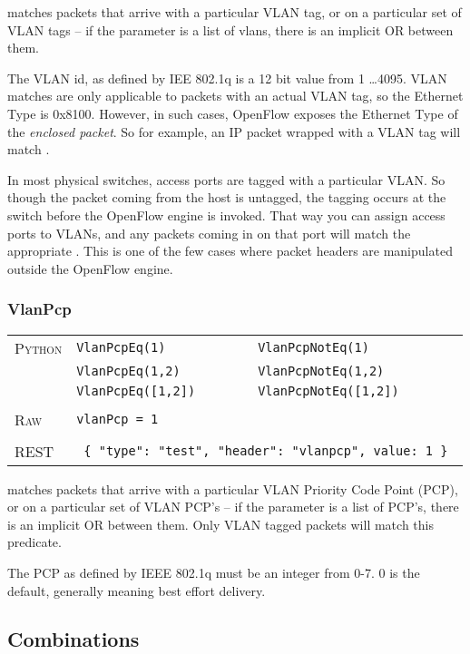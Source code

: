  matches packets that arrive with a particular VLAN tag, or on a particular set of VLAN tags -- 
if the 
parameter is a list of vlans, there is an implicit OR between them.  

The VLAN id, as defined by IEE 802.1q is a 12 bit value from 1 \ldots 4095.  VLAN matches are only applicable
to packets with an actual VLAN tag, so the Ethernet Type is 0x8100.  However, in such cases, 
OpenFlow exposes the Ethernet 
Type of the \emph{enclosed packet}.  So for example, an IP packet wrapped with a VLAN tag will match 
.  

In most physical switches, access ports are tagged with a particular VLAN.  So though the packet coming
from the host is untagged, the tagging occurs at the switch before the OpenFlow engine is invoked.  
That way you can assign access ports to VLANs, and any packets coming in on that port will match the
appropriate .  This is one of the few cases where packet headers are manipulated outside the
OpenFlow engine.  

\subsubsection{VlanPcp}

\bigskip
\begin{tabularx}{\linewidth}{lXX}
\textsc{Python}   & \texttt{VlanPcpEq(1)}    & \texttt{VlanPcpNotEq(1)} \\
    & \texttt{VlanPcpEq(1,2)}  & \texttt{VlanPcpNotEq(1,2)} \\
    & \texttt{VlanPcpEq([1,2])}  & \texttt{VlanPcpNotEq([1,2])} \\ \\
\textsc{Raw}    & \texttt{vlanPcp = 1}     & \\ \\
\textsc{REST} & \multicolumn{2}{l}{\texttt{ \{ "type": "test", "header": "vlanpcp", value: 1 \} }} 
\end{tabularx}

 matches packets that arrive with a particular VLAN Priority Code Point (PCP), 
or on a particular set of VLAN PCP's -- 
if the 
parameter is a list of PCP's, there is an implicit OR between them.  Only VLAN tagged packets
will match this predicate.

The PCP as defined by IEEE 802.1q must be an integer from 0-7.  0 is the default, generally meaning
best effort delivery.  

\subsection{Combinations}


